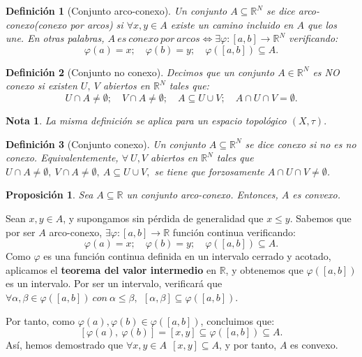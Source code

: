 \documentclass[11pt, a4paper, titlepage]{article}
\makeatletter
\renewenvironment{proof}[1][\proofname] {\vspace{-15pt}\par\pushQED{\qed}\normalfont\topsep6\p@\@plus6\p@\relax\trivlist\item[\hskip\labelsep\it#1\@addpunct{.}]\ignorespaces}{\popQED\endtrivlist\@endpefalse}
\theoremstyle{theorem-style}
\newtheorem*{nprop}{Proposición}
\theoremstyle{definition-style}
\newtheorem*{ndef}{Definición}
\theoremstyle{remark-style}
\newtheorem*{nota}{Nota}
\theoremstyle{example-style}
\makeatother
\begin{document}
\begin{ndef}[Conjunto arco-conexo]
Un conjunto $A \subseteq \mathbb{R}^N$ se dice \emph{arco-conexo(conexo por arcos)} si $\forall x,y \in A$ existe un camino incluido en $A$ que los une. En otras palabras,  $A\ es\ conexo\ por\ arcos \iff \exists \varphi:[a,b] \longrightarrow \mathbb{R}^N$ verificando: $$\varphi(a) = x;\quad \varphi(b) = y;\quad \varphi([a,b]) \subseteq A.$$
\end{ndef}



\begin{ndef}[Conjunto no conexo]
Decimos que un conjunto $A\in \mathbb{R}^N$ es \textit{NO conexo} si existen $U,\ V$ abiertos en $\mathbb{R}^N$ tales que: $$U \cap A \ne \emptyset;\quad V \cap A \ne \emptyset;\quad A \subseteq U \cup V;\quad A \cap U \cap V = \emptyset.$$
\end{ndef}



\begin{nota}
La misma definición se aplica para un espacio topológico $(X,\tau).$
\end{nota}



\begin{ndef}[Conjunto conexo]
Un conjunto $A\subseteq \mathbb{R}^N$ se dice conexo si no es no conexo. Equivalentemente, $\forall \ U,V$ abiertos en $\mathbb{R}^N$ tales que $U \cap A \ne \emptyset, \ V \cap A \ne \emptyset,\ A \subseteq U \cup V,$ se tiene que forzosamente $A \cap U \cap V \ne \emptyset$.
\end{ndef}



\begin{nprop}
Sea $A\subseteq \mathbb{R}$ un conjunto arco-conexo. Entonces, $A$ es convexo.
\end{nprop}

\begin{proof}
Sean $x,y \in A$, y supongamos sin pérdida de generalidad que $x \le y$. Sabemos que por ser $A$ arco-conexo, $\exists \varphi : [a,b] \longrightarrow \mathbb{R}$ función continua verificando: $$\varphi(a) = x;\quad \varphi(b) = y;\quad \varphi([a,b]) \subseteq A.$$
Como $\varphi$ es una función continua definida en un intervalo cerrado y acotado, aplicamos el \textbf{teorema del valor intermedio} en $\mathbb{R}$, y obtenemos que $\varphi([a,b])$ es un intervalo. Por ser un intervalo, verificará que $\forall \alpha, \beta \in \varphi([a,b])\ con\ \alpha \le \beta,\ \ [\alpha,\beta] \subseteq \varphi([a,b])$.

Por tanto, como $\varphi(a), \varphi(b) \in \varphi([a,b])$, concluimos que: $$[\varphi(a),\ \varphi(b)] = [x,y] \subseteq \varphi([a,b]) \subseteq A.$$
Así, hemos demostrado que $\forall x,y \in A\ \ [x,y] \subseteq A$, y por tanto, $A$ es convexo.
\end{proof}
\end{document}
